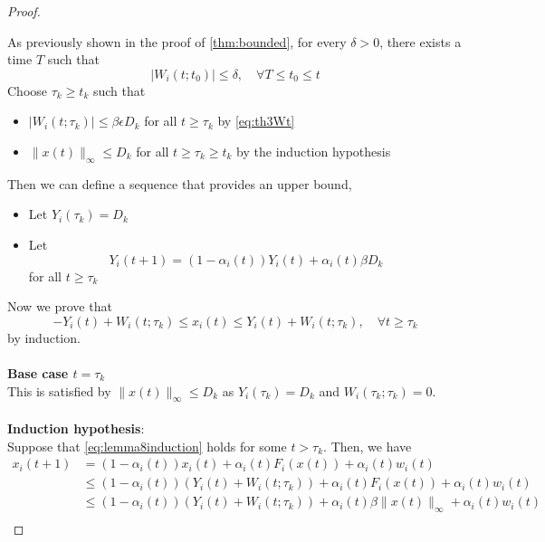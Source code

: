 \begin{proof}
\begin{itemize}
    \end{itemize}
    As previously shown in the proof of \autoref{thm:bounded}, for every $\delta>0$, there exists a time $T$ such that
    \begin{equation}\label{eq:th3Wt}
         |W_i(t;t_0)|\le \delta,\quad \forall T\le t_0\le t
    \end{equation}
    Choose $\tau_k\ge t_k$ such that
    \begin{itemize}
        \item $|W_i(t;\tau_k)|\le \beta\epsilon D_k$ for all $t\ge \tau_k$ by \autoref{eq:th3Wt}\\
        \item $\|x(t)\|_\infty \le D_k$ for all $t\ge \tau_k\ge t_k$ by the induction hypothesis
    \end{itemize}
    Then we can define a sequence that provides an upper bound, 
    \begin{itemize}
        \item Let $Y_i(\tau_k) = D_k$
        \item Let 
        \begin{equation}\label{eq:Yrecusive}
            Y_i(t+1) = (1-\alpha_i(t))Y_i(t)+\alpha_i(t)\beta D_k
        \end{equation}
        for all $t\ge \tau_k$
    \end{itemize}
    Now we prove that 
    \begin{equation}\label{eq:lemma8induction}
     -Y_i(t) + W_i(t;\tau_k)\le x_i(t)\le Y_i(t) + W_i(t;\tau_k),\quad \forall t\ge \tau_k   
    \end{equation}
    by induction.\\
    \\
    \textbf{Base case $t= \tau_k$}\\
    This is satisfied by $\|x(t)\|_\infty \le D_k$ as $Y_i(\tau_k)=D_k$ and $W_i(\tau_k;\tau_k)=0$.\\
    \\
    \textbf{Induction hypothesis}:\\
    Suppose that \autoref{eq:lemma8induction} holds for some $t>\tau_k$. Then, we have
    \begin{align*}
         x_i(t+1) &= (1-\alpha_i(t))x_i(t) + \alpha_i(t)F_i(x(t)) + \alpha_i(t)w_i(t)\\
         &\le (1-\alpha_i(t))(Y_i(t) + W_i(t;\tau_k)) + \alpha_i(t)F_i(x(t)) + \alpha_i(t)w_i(t)\tag{Induction}\\
         &\le (1-\alpha_i(t))(Y_i(t) + W_i(t;\tau_k)) + \alpha_i(t)\beta\|x(t)\|_\infty + \alpha_i(t)w_i(t)\tag{Assumption 3}\\

\end{align*}
\end{proof}
